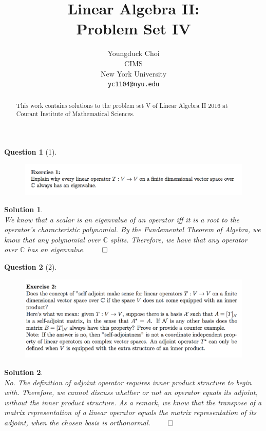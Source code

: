 \documentclass{article} %
\title{Linear Algebra II: \\
Problem Set IV}
\author{
Youngduck Choi \\
CIMS \\
New York University\\
\texttt{yc1104@nyu.edu} \\
}
\theoremstyle{quest}
\newtheorem*{question}{Question}
\newtheorem*{solution}{Solution}
\begin{document}
\maketitle

\begin{abstract}
This work contains solutions to the problem set V
of Linear Algebra II 2016 at Courant Institute of Mathematical Sciences.
\end{abstract}

\bigskip

\begin{question}[1]
\hfill
\begin{figure}[h!]
  \centering
    \includegraphics[width=1\textwidth]{LA-5-1.png}
\end{figure}
\end{question}
\begin{solution} \hfill \\
We know that a scalar is an eigenvalue of an operator iff it is a root to the operator's characteristic
polynomial. By the Fundemental Theorem of Algebra, we know that any polynomial over $\mathbb{C}$ splits.
Therefore, we have that any operator over $\mathbb{C}$ has an eigenvalue. 
\hfill $\qed$

\end{solution}

\bigskip

\begin{question}[2]
\hfill
\begin{figure}[h!]
  \centering
    \includegraphics[width=1\textwidth]{LA-5-2.png}
\end{figure}
\end{question}
\begin{solution} \hfill \\
No. The definition of adjoint operator requires inner product structure to begin with. Therefore,
we cannot discuss whether or not an operator equals its adjoint, without the inner product structure.
As a remark, we know that the transpose of a matrix representation of a linear operator equals
the matrix representation of its adjoint, when the chosen basis is orthonormal.
\hfill $\qed$

\end{solution}
\end{document}
